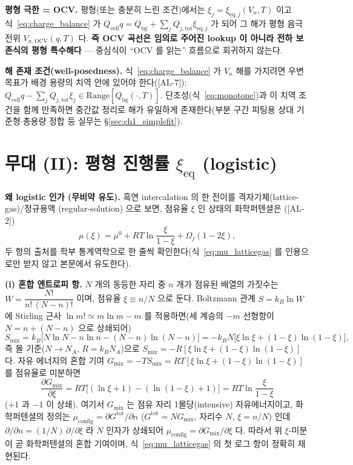 \documentclass[11pt,a4paper]{article}
\newcommand{\eq}{\mathrm{eq}}
\newcommand{\bg}{\mathrm{bg}}
\newcommand{\cell}{\mathrm{cell}}
\newcommand{\OCV}{\mathrm{OCV}}
\newcommand{\tot}{\mathrm{tot}}
\newcommand{\AL}[1]{\textsf{[AL-#1]}}
\begin{document}
\textbf{평형 극한 = OCV.} 평형(또는 충분히 느린 조건)에서는 $\xi_j=\xi_{\eq,j}(V_n,T)$ 이고
식~\eqref{eq:charge_balance} 가 $Q_\cell q=Q_\bg+\sum_j Q_{j,\tot}\xi_{\eq,j}$ 가 되어 그 해가 평형 음극
전위 $V_{n,\OCV}(q,T)$ 다. \textbf{즉 OCV 곡선은 임의로 주어진 lookup 이 아니라 전하 보존식의 평형
특수해다} — 중심식이 ``OCV 를 읽는'' 흐름으로 회귀하지 않는다.

\textbf{해 존재 조건(well-posedness).} 식~\eqref{eq:charge_balance} 가 $V_n$ 해를 가지려면 우변 목표가 배경
용량의 치역 안에 있어야 한다(\AL{7}): $Q_\cell q-\sum_j Q_{j,\tot}\xi_j\in\mathrm{Range}[Q_\bg(\cdot,T)]$.
단조성(식~\eqref{eq:monotone})과 이 치역 조건을 함께 만족하면 중간값 정리로 해가 유일하게 존재한다(부분
구간 피팅용 상대 기준형$\cdot$총용량 정합 등 실무는 \S\ref{sec:ch1_simplefit}).

\section{무대 (II): 평형 진행률 $\xi_\eq$ (logistic)}\label{sec:eq}
\textbf{왜 logistic 인가 (무비약 유도).} 흑연 intercalation 의 한 전이를 격자기체(lattice-gas)/정규용액
(regular-solution) 으로 보면, 점유율 $\xi$ 인 상태의 화학퍼텐셜은 \cite{mckinnon1983,bazant2013}(\AL{2})
\begin{equation}
\mu(\xi)=\mu^0+RT\ln\frac{\xi}{1-\xi}+\Omega_j(1-2\xi),
\label{eq:mu_latticegas}
\end{equation}
두 항의 출처를 학부 통계역학으로 한 줄씩 확인한다(식~\eqref{eq:mu_latticegas} 를 인용으로만 받지 않고 본문에서 유도한다).

\textbf{(i) 혼합 엔트로피 항.} $N$ 개의 동등한 자리 중 $n$ 개가 점유된 배열의 가짓수는
$W=\dfrac{N!}{n!\,(N-n)!}$ 이며, 점유율 $\xi\equiv n/N$ 으로 둔다. Boltzmann 관계 $S=k_B\ln W$ 에 Stirling
근사 $\ln m!\simeq m\ln m-m$ 를 적용하면(세 계승의 $-m$ 선형항이 $N=n+(N-n)$ 으로 상쇄되어)
\begin{equation}
S_{\mathrm{mix}}=k_B\big[N\ln N-n\ln n-(N-n)\ln(N-n)\big]
=-k_B N\big[\xi\ln\xi+(1-\xi)\ln(1-\xi)\big],
\label{eq:smix}
\end{equation}
즉 몰 기준($N\!\to\!N_A$, $R=k_B N_A$)으로 $S_{\mathrm{mix}}=-R[\xi\ln\xi+(1-\xi)\ln(1-\xi)]$ 다. 자유
에너지의 혼합 기여 $G_{\mathrm{mix}}=-TS_{\mathrm{mix}}=RT[\xi\ln\xi+(1-\xi)\ln(1-\xi)]$ 를 점유율로 미분하면
\begin{equation}
\frac{\partial G_{\mathrm{mix}}}{\partial\xi}=RT\big[(\ln\xi+1)-(\ln(1-\xi)+1)\big]=RT\ln\frac{\xi}{1-\xi}
\label{eq:mu_mix}
\end{equation}
($+1$ 과 $-1$ 이 상쇄). 여기서 $G_{\mathrm{mix}}$ 는 점유 자리 1몰당(intensive) 자유에너지이고, 화학퍼텐셜의 정의는
$\mu_{\mathrm{config}}=\partial G^{\mathrm{tot}}/\partial n$ ($G^{\mathrm{tot}}=N G_{\mathrm{mix}}$, 자리수 $N$, $\xi=n/N$)
인데 $\partial/\partial n=(1/N)\,\partial/\partial\xi$ 라 $N$ 인자가 상쇄되어 $\mu_{\mathrm{config}}=\partial G_{\mathrm{mix}}/\partial\xi$
다. 따라서 위 $\xi$-미분이 곧 화학퍼텐셜의 혼합 기여이며, 식~\eqref{eq:mu_latticegas} 의 첫 로그 항이 정확히 재현된다.
\end{document}
